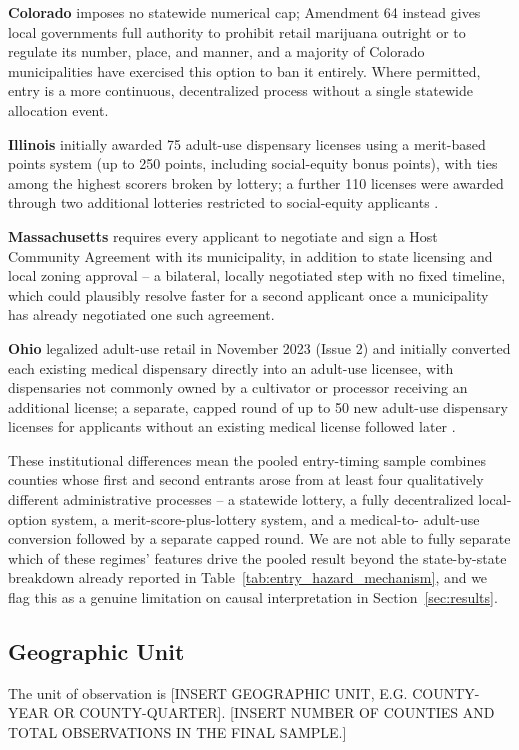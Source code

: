 \documentclass[12pt]{article}
\begin{document}
\textbf{Colorado} imposes no statewide numerical cap; Amendment 64 instead gives local governments full
authority to prohibit retail marijuana outright or to regulate its number, place, and manner, and a majority
of Colorado municipalities have exercised this option to ban it entirely. Where permitted, entry is a more
continuous, decentralized process without a single statewide allocation event.

\textbf{Illinois} initially awarded 75 adult-use dispensary licenses using a merit-based points system (up to
250 points, including social-equity bonus points), with ties among the highest scorers broken by lottery; a
further 110 licenses were awarded through two additional lotteries restricted to social-equity applicants
\citep{IDFPRAdultUseCannabis}.

\textbf{Massachusetts} requires every applicant to negotiate and sign a Host Community Agreement with its
municipality, in addition to state licensing and local zoning approval \citep{MACCCLicensing} -- a
bilateral, locally negotiated step with no fixed timeline, which could plausibly resolve faster for a second
applicant once a municipality has already negotiated one such agreement.

\textbf{Ohio} legalized adult-use retail in November 2023 (Issue 2) and initially converted each existing
medical dispensary directly into an adult-use licensee, with dispensaries not commonly owned by a cultivator
or processor receiving an additional license; a separate, capped round of up to 50 new adult-use dispensary
licenses for applicants without an existing medical license followed later \citep{OhioDCCFAQ}.

These institutional differences mean the pooled entry-timing sample combines counties whose first and
second entrants arose from at least four qualitatively different administrative processes -- a statewide
lottery, a fully decentralized local-option system, a merit-score-plus-lottery system, and a medical-to-
adult-use conversion followed by a separate capped round. We are not able to fully separate which of these
regimes' features drive the pooled result beyond the state-by-state breakdown already reported in
Table~\ref{tab:entry_hazard_mechanism}, and we flag this as a genuine limitation on causal interpretation in
Section~\ref{sec:results}.

\subsection{Geographic Unit}
The unit of observation is [INSERT GEOGRAPHIC UNIT, E.G. COUNTY-YEAR OR COUNTY-QUARTER]. [INSERT NUMBER OF
COUNTIES AND TOTAL OBSERVATIONS IN THE FINAL SAMPLE.]
\end{document}
